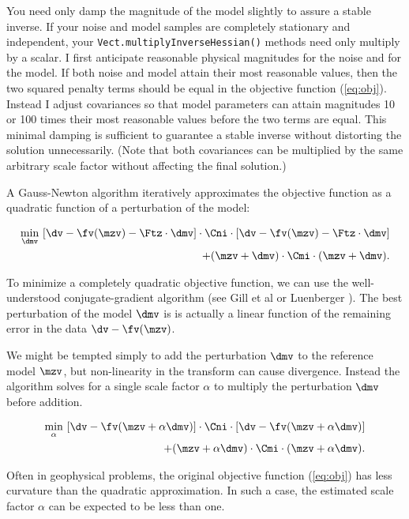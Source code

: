 \documentclass[12pt]{article}
\begin{document}
You need only damp the magnitude of the model
slightly to assure a stable inverse.  If your
noise and model samples are completely
stationary and independent, your
\texttt{Vect.multiply\-Inverse\-Hessian()}
methods need only multiply by a scalar.  I
first anticipate reasonable physical
magnitudes for the noise and for the model.
If both noise and model attain their most
reasonable values, then the two squared
penalty terms should be equal in the
objective function (\ref{eq:obj}).  Instead I
adjust covariances so that model parameters
can attain magnitudes 10 or 100 times their
most reasonable values before the two terms
are equal.  This minimal damping is
sufficient to guarantee a stable inverse
without distorting the solution
unnecessarily.  (Note that both covariances
can be multiplied by the same arbitrary scale
factor without affecting the final solution.)

A Gauss-Newton algorithm iteratively
approximates the objective function as a
quadratic function of a perturbation of the
model:

\begin{eqnarray}
\label{eq:qobj}
\min_{\dmv} ~  [\dv - \fv (\mzv) - \Ftz \cdot \dmv ] \cdot
 \Cni \cdot [\dv - \fv (\mzv) - \Ftz \cdot \dmv ] \nonumber \\
           + (\mzv + \dmv)  \cdot \Cmi \cdot (\mzv + \dmv).
\end{eqnarray}

\noindent To minimize a completely quadratic
objective function, we can use the
well-understood conjugate-gradient algorithm
(see Gill et al \cite{gill} or Luenberger
\cite{luenberger}).  The best perturbation of
the model $\dmv$ is is actually a linear
function of the remaining error in the data
$\dv - \fv (\mzv)$.

We might be tempted simply to add the
perturbation $\dmv$ to the reference model
$\mzv$, but non-linearity in the transform
can cause divergence.  Instead the algorithm
solves for a single scale factor $\alpha$ to
multiply the perturbation $\dmv$ before
addition.

\begin{eqnarray}
\min_{\alpha} ~  [\dv - \fv (\mzv + \alpha \dmv) ] \cdot
 \Cni \cdot [\dv - \fv (\mzv + \alpha \dmv) ] \nonumber \\
           + (\mzv + \alpha \dmv)  \cdot \Cmi \cdot (\mzv + \alpha \dmv).
\end{eqnarray}

\noindent Often in geophysical problems, the
original objective function (\ref{eq:obj})
has less curvature than the quadratic
approximation.  In such a case, the estimated
scale factor $\alpha$ can be expected to be
less than one.
\end{document}
